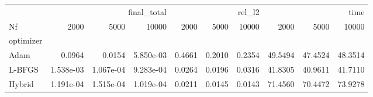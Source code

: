 \begin{tabular}{lrrrrrrrrr}
\toprule
 & \multicolumn{3}{r}{final_total} & \multicolumn{3}{r}{rel_l2} & \multicolumn{3}{r}{time} \\
Nf & 2000 & 5000 & 10000 & 2000 & 5000 & 10000 & 2000 & 5000 & 10000 \\
optimizer &  &  &  &  &  &  &  &  &  \\
\midrule
Adam & 0.0964 & 0.0154 & 5.850e-03 & 0.4661 & 0.2010 & 0.2354 & 49.5494 & 47.4524 & 48.3514 \\
L-BFGS & 1.538e-03 & 1.067e-04 & 9.283e-04 & 0.0264 & 0.0196 & 0.0316 & 41.8305 & 40.9611 & 41.7110 \\
Hybrid & 1.191e-04 & 1.515e-04 & 1.019e-04 & 0.0211 & 0.0145 & 0.0143 & 71.4560 & 70.4472 & 73.9278 \\
\bottomrule
\end{tabular}
